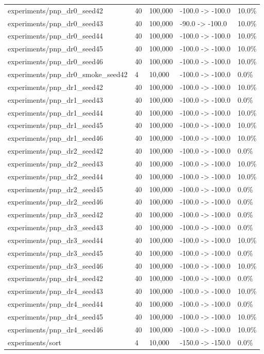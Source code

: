 \documentclass[11pt,a4paper,oneside]{book}
\begin{document}
\begin{longtable}{l l l l l}
experiments/pnp\_dr0\_seed42 & 40 & 100,000 & -100.0 -> -100.0 & 10.0\% \\
experiments/pnp\_dr0\_seed43 & 40 & 100,000 & -90.0 -> -100.0 & 10.0\% \\
experiments/pnp\_dr0\_seed44 & 40 & 100,000 & -100.0 -> -100.0 & 10.0\% \\
experiments/pnp\_dr0\_seed45 & 40 & 100,000 & -100.0 -> -100.0 & 10.0\% \\
experiments/pnp\_dr0\_seed46 & 40 & 100,000 & -100.0 -> -100.0 & 10.0\% \\
experiments/pnp\_dr0\_smoke\_seed42 & 4 & 10,000 & -100.0 -> -100.0 & 0.0\% \\
experiments/pnp\_dr1\_seed42 & 40 & 100,000 & -100.0 -> -100.0 & 10.0\% \\
experiments/pnp\_dr1\_seed43 & 40 & 100,000 & -100.0 -> -100.0 & 0.0\% \\
experiments/pnp\_dr1\_seed44 & 40 & 100,000 & -100.0 -> -100.0 & 10.0\% \\
experiments/pnp\_dr1\_seed45 & 40 & 100,000 & -100.0 -> -100.0 & 10.0\% \\
experiments/pnp\_dr1\_seed46 & 40 & 100,000 & -100.0 -> -100.0 & 10.0\% \\
experiments/pnp\_dr2\_seed42 & 40 & 100,000 & -100.0 -> -100.0 & 0.0\% \\
experiments/pnp\_dr2\_seed43 & 40 & 100,000 & -100.0 -> -100.0 & 10.0\% \\
experiments/pnp\_dr2\_seed44 & 40 & 100,000 & -100.0 -> -100.0 & 10.0\% \\
experiments/pnp\_dr2\_seed45 & 40 & 100,000 & -100.0 -> -100.0 & 0.0\% \\
experiments/pnp\_dr2\_seed46 & 40 & 100,000 & -100.0 -> -100.0 & 0.0\% \\
experiments/pnp\_dr3\_seed42 & 40 & 100,000 & -100.0 -> -100.0 & 0.0\% \\
experiments/pnp\_dr3\_seed43 & 40 & 100,000 & -100.0 -> -100.0 & 0.0\% \\
experiments/pnp\_dr3\_seed44 & 40 & 100,000 & -100.0 -> -100.0 & 10.0\% \\
experiments/pnp\_dr3\_seed45 & 40 & 100,000 & -100.0 -> -100.0 & 0.0\% \\
experiments/pnp\_dr3\_seed46 & 40 & 100,000 & -100.0 -> -100.0 & 10.0\% \\
experiments/pnp\_dr4\_seed42 & 40 & 100,000 & -100.0 -> -100.0 & 0.0\% \\
experiments/pnp\_dr4\_seed43 & 40 & 100,000 & -100.0 -> -100.0 & 10.0\% \\
experiments/pnp\_dr4\_seed44 & 40 & 100,000 & -100.0 -> -100.0 & 0.0\% \\
experiments/pnp\_dr4\_seed45 & 40 & 100,000 & -100.0 -> -100.0 & 10.0\% \\
experiments/pnp\_dr4\_seed46 & 40 & 100,000 & -100.0 -> -100.0 & 10.0\% \\
experiments/sort & 4 & 10,000 & -150.0 -> -150.0 & 0.0\% \\
\bottomrule \end{longtable}
\end{document}
